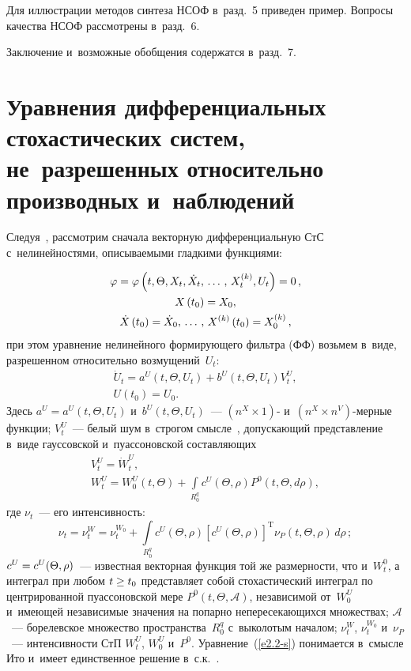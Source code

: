 \begin{multicols}{2}
Для иллюстрации методов синтеза НСОФ в~разд.~5 приведен пример. Вопросы качества НСОФ рассмотрены в~разд.~6. 

Заключение и~возможные обобщения содержатся в~разд.~7.

\vspace*{-6pt}

\section{Уравнения  дифференциальных стохастических систем, 
не~разрешенных относительно производных и~наблюдений}

\vspace*{-3pt}


Следуя~\cite{8-s}, рассмотрим сначала векторную дифференциальную СтС с~нелинейностями, 
описываемыми гладкими функциями:

\pagebreak

\noindent
\begin{multline}
\varphi =\varphi\left(t, \Theta, X_t, \dot X_t ,\,\ldots\,,\, X_t^{(k)}, U_t\right) =0\,, \\ 
X\left(t_0\right) = X_0,\\
  \dot X\left(t_0\right) = \dot X_0 ,\,\ldots\,,\, X^{(k)} \left(t_0\right) = X_0^{(k)}\,,
\label{e2.1-s}
\end{multline}
    при этом уравнение нелинейного формирующего фильтра (ФФ) возьмем в~виде, 
    разрешенном относительно возмущений~$U_t$:
\begin{multline}
\dot U_t = a^U \left(t, \Theta,U_t\right)  + b^U \left(t, \Theta,U_t\right) V_t^U, \\
 U\left(t_0\right) = U_0.
\label{e2.2-s}
\end{multline}
Здесь $a^U = a^U(t, \Theta,U_t)$ и~$b^U(t, \Theta,U_t)$~--- $(n^X\times 1)$- и~$(n^X\times n^V)$-мер\-ные 
функции; $V_t^U$~--- белый шум в~строгом смысле~\cite{1-s, 2-s}, 
допускающий представление в~виде гауссовской и~пуассоновской составляющих
\begin{multline*}
    V_t^U = \dot W_t^U, \\ 
    W_t^U = W_0^U (t,\Theta) + \int\limits_{R_0^q} c^U (\Theta,\rho)
     P^0 ( t,\Theta, d\rho),
     \end{multline*}
где $\nu_t$~--- его интенсивность:
   \begin{equation*}
    \nu_t=\nu_t^W \!=\nu_t^{W_0} +\!  \int\limits_{R_0^q}\!\! c^U (\Theta,\rho) 
    \left[c^U (\Theta,\rho)\right]^{\mathrm{T}}\! \nu_P (t,\Theta,\rho)\, d\rho\,;
    \end{equation*}
 $c^U \hm= c^U(\Theta,\rho)$~--- 
известная векторная функция той же размерности, что и~$W_t^0$, а интеграл при любом $t\hm\ge t_0$ 
представляет собой стохастический интеграл по центрированной пуассоновской мере $P^0(t,\Theta,\mathcal{A})$,
 независимой от~$W_0^U$ и~имеющей независимые значения на попарно непересекающихся множествах; 
 $\mathcal{A}$~--- борелевское множество пространства~$R_0^q$ с~выколотым началом; 
 $\nu_t^W$, $\nu_t^{W_0}$ и~$\nu_P$~--- интенсивности СтП $W_t^U$, $W_{0}^U$ и~$P^0$. Уравнение~(\ref{e2.2-s}) 
 понимается в~смысле Ито и~имеет единственное решение в~с.к.~\cite{1-s, 2-s}.


\end{multicols}
